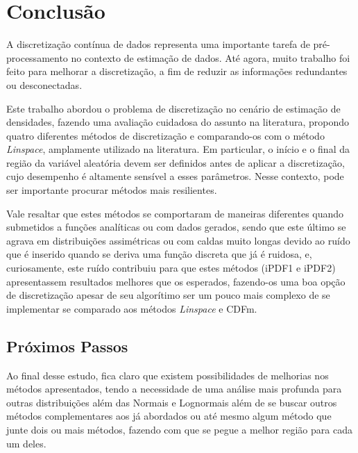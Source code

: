 \chapter{Conclusão} \label{cap:conclusao}
\vspace{-2cm}
A discretização contínua de dados representa uma importante tarefa de pré-processamento no contexto de estimação de dados. Até agora, muito trabalho foi feito para melhorar a discretização, a fim de reduzir as informações redundantes ou desconectadas.

Este trabalho abordou o problema de discretização no cenário de estimação de densidades, fazendo uma avaliação cuidadosa do assunto na literatura, propondo quatro diferentes métodos de discretização e comparando-os com o método \textit{Linspace}, amplamente utilizado na literatura. Em particular, o início e o final da região da variável aleatória devem ser definidos antes de aplicar a discretização, cujo desempenho é altamente sensível a esses parâmetros. Nesse contexto, pode ser importante procurar métodos mais resilientes.

Vale resaltar que estes métodos se comportaram de maneiras diferentes quando submetidos a funções analíticas ou com dados gerados, sendo que este último se agrava em distribuições assimétricas ou com caldas muito longas devido ao ruído que é inserido quando se deriva uma função discreta que já é ruidosa, e, curiosamente, este ruído contribuiu para que estes métodos (\ac{iPDF1} e \ac{iPDF2}) apresentassem resultados melhores que os esperados, fazendo-os uma boa opção de discretização apesar de seu algorítimo ser um pouco mais complexo de se implementar se comparado aos métodos \textit{Linspace} e \ac{CDFm}.

\section{Próximos Passos}
Ao final desse estudo, fica claro que existem possibilidades de melhorias nos métodos apresentados, tendo a necessidade de uma análise mais profunda para outras distribuições além das Normais e Lognormais além de se buscar outros métodos complementares aos já abordados ou até mesmo algum método que junte dois ou mais métodos, fazendo com que se pegue a melhor região para cada um deles.